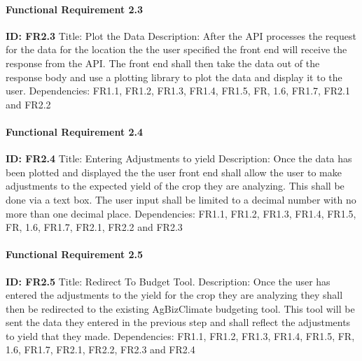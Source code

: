 \documentclass[onecolumn, draftclsnofoot,10pt, compsoc]{article}
\begin{document}
				\paragraph{Functional Requirement 2.3}
					\textbf{ID: FR2.3}\newline
					Title: Plot the Data\newline
					Description: After the API processes the request for the data for the location the the user specified the front end will receive the response from the API. The front end shall then take the data out of the response body and use a plotting library to plot the data and display it to the user.\newline
					Dependencies: FR1.1, FR1.2, FR1.3, FR1.4, FR1.5, FR, 1.6, FR1.7, FR2.1 and FR2.2\newline
				
				\paragraph{Functional Requirement 2.4}
					\textbf{ID: FR2.4}\newline
					Title: Entering Adjustments to yield\newline
					Description: Once the data has been plotted and displayed the the user front end shall allow the user to make adjustments to the expected yield of the crop they are analyzing. This shall be done via a text box. The user input shall be limited to a decimal number with no more than one decimal place.\newline
					Dependencies: FR1.1, FR1.2, FR1.3, FR1.4, FR1.5, FR, 1.6, FR1.7, FR2.1, FR2.2 and FR2.3\newline
				
				\paragraph{Functional Requirement 2.5}
					\textbf{ID: FR2.5}\newline
					Title: Redirect To Budget Tool.\newline
					Description: Once the user has entered the adjustments to the yield for the crop they are analyzing they shall then be redirected to the existing AgBizClimate budgeting tool. This tool will be sent the data they entered in the previous step and shall reflect the adjustments to yield that they made.\newline
					Dependencies: FR1.1, FR1.2, FR1.3, FR1.4, FR1.5, FR, 1.6, FR1.7, FR2.1, FR2.2, FR2.3 and FR2.4\newline
\end{document}
